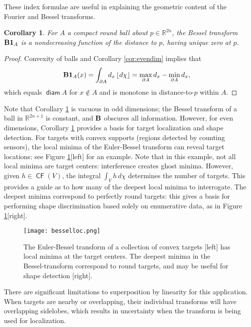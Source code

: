 \documentclass{psapm-l}
\newtheorem{corollary}[theorem]{Corollary}
\theoremstyle{definition}
\theoremstyle{remark}
\numberwithin{equation}{section}
\begin{document}
These index formulae are useful in explaining the geometric content of the Fourier and Bessel transforms.

\begin{corollary}
\label{cor:monotone}
For $A$ a compact round ball about $p\in{{\mathbb R}}^{2n}$, the Bessel transform ${{\bf B}}{{\mathbf{1}}}_A$ is a nondecreasing function of the distance to $p$, having unique zero at $p$.
\end{corollary}
\begin{proof}
Convexity of balls and Corollary \ref{cor:evendim} implies that
\[
        {{\bf B}}{{\mathbf{1}}}_A(x) = \int_{{\partial} A} d_x\,{{\lfloor d\chi\rfloor}} = \max_{{\partial} A}d_x - \min_{{\partial} A}d_x ,
\]
which equals ${{{\operatorname{\mathsf{{diam}}}}}} A$ for $x\not\in A$ and is monotone in distance-to-$p$ within $A$.
\end{proof}

Note that Corollary \ref{cor:monotone} is vacuous in odd dimensions; the Bessel transform of a ball in ${{\mathbb R}}^{2n+1}$ is constant, and ${{\bf B}}$ obscures all information. However, for even dimensions, Corollary \ref{cor:monotone} provides a basis for target localization and shape detection. For targets with convex supports (regions detected by counting sensors), the local minima of the Euler-Bessel transform can reveal target locations: see Figure \ref{fig:besselloc}[left] for an example. Note that in this example, not all local minima are target centers: interference creates ghost minima. However, given $h\in{{{\operatorname{\mathsf{{CF}}}}}}(V)$, the integral $\int_Vh\,d\chi$ determines the number of targets. This provides a guide as to how many of the deepest local minima to interrogate. The deepest minima correspond to perfectly round targets: this gives a basis for performing shape discrimination based solely on enumerative data, as in Figure \ref{fig:besselloc}[right].

\begin{figure}[hbt]
\begin{center}
\texttt{[image: besselloc.png]}
\caption{The Euler-Bessel transform of a collection of convex targets [left] has local minima at the target centers. The deepest minima in the Bessel-transform correspond to round targets, and may be useful for shape detection [right].}
\label{fig:besselloc}
\end{center}
\end{figure}

There are significant limitations to superposition by linearity for this application. When targets are nearby or overlapping, their individual transforms will have overlapping sidelobes, which results in uncertainty when the transform is being used for localization.
 
\end{document}
